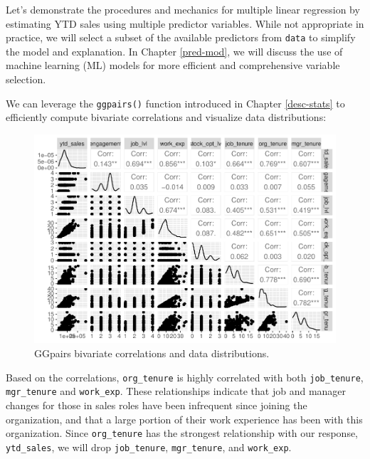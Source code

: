 \documentclass[
]{book}
\begin{document}
Let's demonstrate the procedures and mechanics for multiple linear regression by estimating YTD sales using multiple predictor variables. While not appropriate in practice, we will select a subset of the available predictors from \texttt{data} to simplify the model and explanation. In Chapter \ref{pred-mod}, we will discuss the use of machine learning (ML) models for more efficient and comprehensive variable selection.

We can leverage the \texttt{ggpairs()} function introduced in Chapter \ref{desc-stats} to efficiently compute bivariate correlations and visualize data distributions:

\begin{figure}

{\centering \includegraphics[width=1\linewidth]{People_Analytics_Lifecycle_files/figure-latex/ggpairs-ytd-sales-1} 

}

\caption{GGpairs bivariate correlations and data distributions.}\label{fig:ggpairs-ytd-sales}
\end{figure}

Based on the correlations, \texttt{org\_tenure} is highly correlated with both \texttt{job\_tenure}, \texttt{mgr\_tenure} and \texttt{work\_exp}. These relationships indicate that job and manager changes for those in sales roles have been infrequent since joining the organization, and that a large portion of their work experience has been with this organization. Since \texttt{org\_tenure} has the strongest relationship with our response, \texttt{ytd\_sales}, we will drop \texttt{job\_tenure}, \texttt{mgr\_tenure}, and \texttt{work\_exp}.
\end{document}
